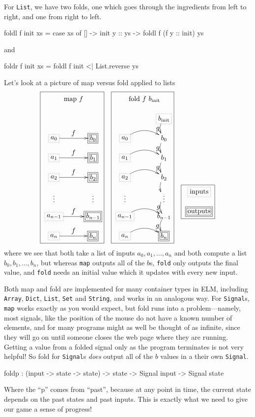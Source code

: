 \documentclass[12pt]{amsbook}
\begin{document}
For \texttt{List}, we have two folds, one which goes through the ingredients from left to right, and one from right to left.
\begin{code}
foldl f init xs = case xs of
                    []      -> init
                    y :: ys -> foldl f (f y :: init) ys
\end{code}
and
\begin{code}
foldr f init xs = foldl f init <| List.reverse ys
\end{code}
Let's look at a picture of map versus fold applied to lists
\[ \fbox{ \xygraph{
!{<0cm,0cm>;<1cm,0cm>:<0cm,1cm>::}
!{(1,6)}{\text{map}\ f}
!{(0,4)}*+[F.]{a_0}="a0"
!{(0,3)}*+[F.]{a_1}="a1"
!{(0,2)}*+[F.]{a_2}="a2"
!{(0,1)}{\vdots}="adots"
!{(0,0)}*+[F.]{a_{n-1}}="an1"
!{(0,-1)}*+[F.]{a_n}="an"
!{(2,4)}*+[F=]{b_0}="b0"
!{(2,3)}*+[F=]{b_1}="b1"
!{(2,2)}*+[F=]{b_2}="b2"
!{(2,1)}{\vdots}="bdots"
!{(2,0)}*+[F=]{b_{n-1}}="bn1"
!{(2,-1)}*+[F=]{b_n}="bn"
"a0":"b0"^*{f}
"a1":"b1"^*{f}
"a2":"b2"^*{f}
"an1":"bn1"^*{f}
"an":"bn"^*{f}
}}\quad
\fbox{ \xygraph{
!{<0cm,0cm>;<1cm,0cm>:<0cm,1cm>::}
!{(1,6)}{\text{fold}\ f\ b_{\text{init}}}
!{(0,4)}*+[F.]{a_0}="a0"
!{(0,3)}*+[F.]{a_1}="a1"
!{(0,2)}*+[F.]{a_2}="a2"
!{(0,1)}{\vdots}="adots"
!{(0,0)}*+[F.]{a_{n-1}}="an1"
!{(0,-1)}*+[F.]{a_n}="an"
!{(2,5)}*+[F.]{b_{\text{init}}}="binit"
!{(2,4)}{b_0}="b0"
!{(2,3)}{b_1}="b1"
!{(2,2)}{b_2}="b2"
!{(2,1)}{\vdots}="bdots"
!{(2,0)}*{b_{n-1}}="bn1"
!{(2,-1)}*+[F=]{b_n}="bn"
"a0":@/^{0.4cm}/"b0"^>>*{g}
"a1":@/^{0.4cm}/"b1"^>>*{g}
"a2":@/^{0.4cm}/"b2"^>>*{g}
"an1":@/^{0.4cm}/"bn1"^>>*{g}
"an":@/^{0.4cm}/"bn"^>>*{g}
"binit":@/^{-0.2cm}/"b0"
"b0":@/^{-0.2cm}/"b1"
"b1":@/^{-0.2cm}/"b2"
"b2":@/^{-0.2cm}/"bdots"
"bdots":@/^{-0.2cm}/"bn1"
"bn1":@/^{-0.2cm}/"bn"
}}
\quad
\fbox{ \xygraph{
!{<0cm,0cm>;<1cm,0cm>:<0cm,1cm>::}
!{(0,5)}*+[F.]{\text{inputs}}
!{(0,4)}*+[F=]{\text{outputs}}
}}
\]
where we see that both take a list of inputs $a_0,a_1,\dots,a_n$
and both compute a list $b_0,b_1,\dots,b_n$,
but whereas \texttt{map} outputs all of the $b$s, 
\texttt{fold} only outputs the final value, 
and \texttt{fold} needs an initial value which it updates with every new input.

Both map and fold are implemented for many container types in ELM, 
including \texttt{Array}, \texttt{Dict}, \texttt{List}, \texttt{Set} and \texttt{String},
and works in an analogous way.
For \texttt{Signal}s, \texttt{map} works exactly as you would expect,
but fold runs into a problem---namely, most signals, like the position
of the mouse do not have a known number of elements, 
and for many programs might as well be thought of as infinite, 
since they will go on until someone closes the web page where they are running.
Getting a value from a folded signal only as the program terminates is not very helpful!
So fold for \texttt{Signal}s \emph{does} output all of the $b$ values in a their own  \texttt{Signal}.
\begin{code}
foldp : (input -> state -> state) -> state -> Signal input -> Signal state
\end{code}
Where the ``p'' comes from ``past'',
because at any point in time,
the current state depends on the past states and past inputs.
This is exactly what we need to give our game a sense of progress!
\end{document}
